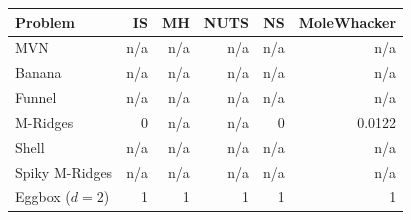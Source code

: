 \begin{tabular}{lrrrrr}
\toprule
Problem & IS & MH & NUTS & NS & MoleWhacker \\
\midrule
MVN & n/a & n/a & n/a & n/a & n/a \\
Banana & n/a & n/a & n/a & n/a & n/a \\
Funnel & n/a & n/a & n/a & n/a & n/a \\
M-Ridges & 0 & n/a & n/a & 0 & 0.0122 \\
Shell & n/a & n/a & n/a & n/a & n/a \\
Spiky M-Ridges & n/a & n/a & n/a & n/a & n/a \\
\midrule
Eggbox ($d=2$) & 1 & 1 & 1 & 1 & 1 \\
\bottomrule
\end{tabular}

